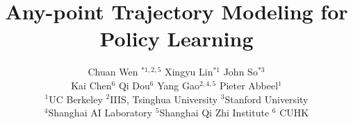 \documentclass[conference]{IEEEtran}
\begin{document}
\title{Any-point Trajectory Modeling for Policy Learning}

\author{Chuan Wen $^{*1,2,5}$ \quad Xingyu Lin$^{*1}$ \quad John So$^{*3}$ \\
Kai Chen$^{6}$ \quad Qi Dou$^{6}$ \quad Yang Gao$^{2,4,5}$ \quad Pieter Abbeel$^{1}$ \\
$^{1}$UC Berkeley \quad $^{2}$IIIS, Tsinghua University \quad $^{3}$Stanford University \\
$^{4}$Shanghai AI Laboratory \quad $^{5}$Shanghai Qi Zhi Institute \quad $^{6}$ CUHK \\
}





% 
\end{document}

